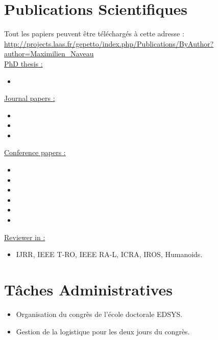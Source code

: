 \documentclass[11pt,a4paper,sans]{moderncv}        %
\newcommand{\items}{\item \hspace{2mm}}
\begin{document}
\section{Publications Scientifiques}

Tout les papiers peuvent \^etre t\'el\'echarg\'es \`a cette adresse :
\url{http://projects.laas.fr/gepetto/index.php/Publications/ByAuthor?author=Maximilien_Naveau}\\

\large{\underline{PhD thesis :}}

\begin{itemize}%
\items {}
\end{itemize}

\large{\underline{Journal papers :}}

\begin{itemize}%
\items {}
\items {}
\items {}
\end{itemize}%


\large{\underline{Conference papers :}}

\begin{itemize}%
\items {}
\items {}
\items {}
\items {}
\items {}
\items {}
\end{itemize}


\large{\underline{Reviewer in :}}
\begin{itemize}%
\items IJRR, IEEE T-RO, IEEE RA-L, ICRA, IROS, Humanoids.
\end{itemize}

\section{T\^aches Administratives}

{
\begin{itemize}
\items Organisation du congr\`es de l'\'ecole doctorale EDSYS.
\items Gestion de la logistique pour les deux jours du congr\`es.
\end{itemize}
}
\end{document}
